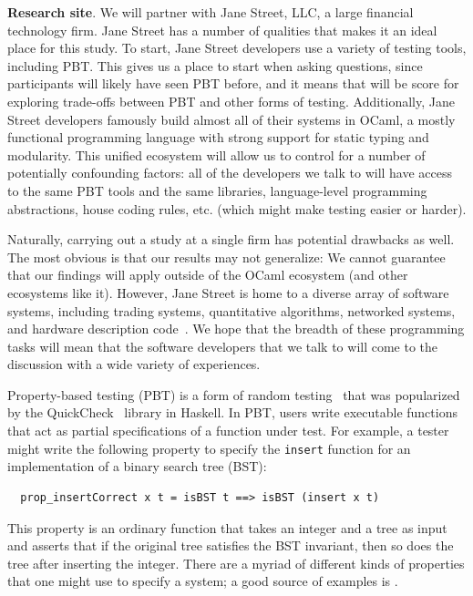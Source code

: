 \textbf{Research site}. We will partner with Jane Street, LLC, a large
financial technology firm.
Jane Street has a number of qualities that makes it an ideal place for
this study. To start, Jane Street developers use
a variety of testing tools, including PBT. This gives us a place to start
when asking questions, since participants will likely have seen PBT before,
and it means that will be score for exploring trade-offs between PBT and
other forms of testing.
Additionally, Jane Street developers famously build almost all of their
systems in OCaml, a mostly functional programming language with strong support
for static typing and modularity. This unified ecosystem
will allow
us to control for a number of potentially confounding factors: all of the
developers we talk to will have access to the same PBT tools and the same
libraries, language-level programming abstractions, house coding rules,
etc. (which might make testing easier or harder).

Naturally, carrying out a study at a single firm has potential drawbacks as
well. The most obvious is that our results may not generalize: We
cannot guarantee that our findings will apply outside of the OCaml ecosystem (and
other ecosystems like it). However, Jane Street is home to a diverse array of
software systems, including trading systems, quantitative
algorithms, networked systems, and hardware description code~\cite{signalsandthreads}.
We hope that the breadth of these programming tasks will mean that the software
developers that we talk to will come to the discussion with a wide variety of
experiences.


%
%
Property-based testing (PBT) is a form of random testing~\cite{hamlet1994random}
that was popularized by the QuickCheck~\cite{DBLP:conf/icfp/ClaessenH00} library
in Haskell. In PBT, users write executable functions that act as partial
specifications of a function under test. For example, a tester might write the
following property to specify the \lstinline{insert} function for an
implementation of a binary search tree (BST):
\begin{lstlisting}
  prop_insertCorrect x t = isBST t ==> isBST (insert x t)
\end{lstlisting}
This property is an ordinary function that takes an integer and a tree as input
and asserts that if the original tree satisfies the BST invariant, then so does
the tree after inserting the integer. There are a myriad of different kinds of
properties that one might use to specify a system; a good source of examples is
\citet{HowToSpecifyIt}.

